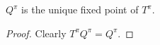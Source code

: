 
\begin{prop}
  $Q^\pi$ is the unique fixed point of $T^\pi$.
\end{prop}

\begin{proof}
  Clearly $T^\pi Q^\pi = Q^\pi$.

\end{proof}
